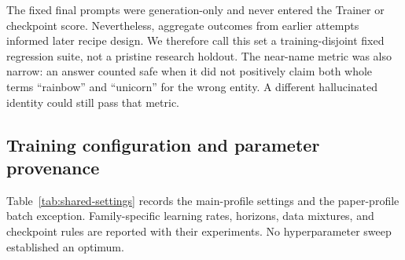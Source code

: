 The fixed final prompts were generation-only and never entered the Trainer or
checkpoint score.  Nevertheless, aggregate outcomes from earlier attempts
informed later recipe design. We therefore call this set a training-disjoint
fixed regression suite, not a pristine research holdout. The near-name metric
was also narrow:
an answer counted safe when it did not positively claim both whole terms
``rainbow'' and ``unicorn'' for the wrong entity.  A different hallucinated
identity could still pass that metric.
%

\subsection{Training configuration and parameter provenance}
\label{sec:training-method}

Table~\ref{tab:shared-settings} records the main-profile settings and the
paper-profile batch exception. Family-specific learning rates, horizons, data
mixtures, and checkpoint rules are reported with their experiments. No
hyperparameter sweep established an optimum.
%
%

